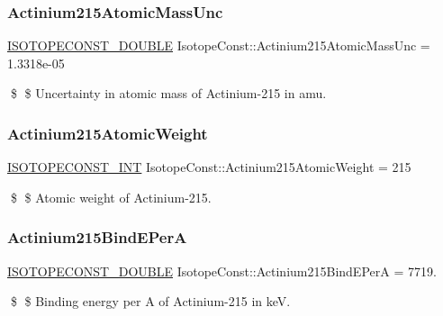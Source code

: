 \subsubsection{\texorpdfstring{Actinium215\+Atomic\+Mass\+Unc}{Actinium215AtomicMassUnc}}
{\footnotesize\ttfamily \mbox{\hyperlink{group___isotope_const-_macros_ga8f45a7272ce02c0b4c65c44636ed719a}{I\+S\+O\+T\+O\+P\+E\+C\+O\+N\+S\+T\+\_\+\+D\+O\+U\+B\+LE}} Isotope\+Const\+::\+Actinium215\+Atomic\+Mass\+Unc = 1.\+3318e-\/05}

\$ \$ Uncertainty in atomic mass of Actinium-\/215 in amu. \mbox{\label{group___isotope_const-_actinium-_ac215_ga7df68aa152b737b4ed93b3a15ae4425d}} 
\subsubsection{\texorpdfstring{Actinium215\+Atomic\+Weight}{Actinium215AtomicWeight}}
{\footnotesize\ttfamily \mbox{\hyperlink{group___isotope_const-_macros_ga5f18360b3e99483a35c32d789e62621c}{I\+S\+O\+T\+O\+P\+E\+C\+O\+N\+S\+T\+\_\+\+I\+NT}} Isotope\+Const\+::\+Actinium215\+Atomic\+Weight = 215}

\$ \$ Atomic weight of Actinium-\/215. \mbox{\label{group___isotope_const-_actinium-_ac215_ga4dfa851c7c1f30c5f737c25dfade4a1e}} 
\subsubsection{\texorpdfstring{Actinium215\+Bind\+E\+PerA}{Actinium215BindEPerA}}
{\footnotesize\ttfamily \mbox{\hyperlink{group___isotope_const-_macros_ga8f45a7272ce02c0b4c65c44636ed719a}{I\+S\+O\+T\+O\+P\+E\+C\+O\+N\+S\+T\+\_\+\+D\+O\+U\+B\+LE}} Isotope\+Const\+::\+Actinium215\+Bind\+E\+PerA = 7719.}

\$ \$ Binding energy per A of Actinium-\/215 in keV. \mbox{\label{group___isotope_const-_actinium-_ac215_ga84ff5f947dbacc1e471152d46ccb7a0b}} 
